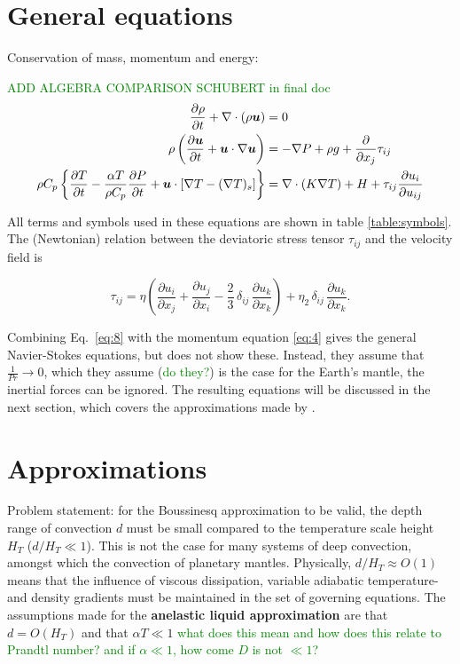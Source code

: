 \documentclass[document.tex]{subfiles}
\begin{document}
\section{\cite{jamc80} General equations}
Conservation of mass, momentum and energy: 

\textcolor{green}{ADD ALGEBRA COMPARISON SCHUBERT in final doc}
\begin{align}
    \pdv{\rho}{t} + \nabla \cdot (\rho\bm{u}) &= 0  \label{eq:3}\\
    \rho\left(\pdv{\bm{u}}{t} + \bm{u} \cdot \nabla \bm{u}\right) &= -\nabla P +\rho g + \pdv{x_j} \tau_{ij} \label{eq:4}\\
    \rho C_p \left\{\pdv{T}{t} - \frac{\alpha T}{\rho C_p}\pdv{P}{t} + \bm{u} \cdot [\nabla T - (\nabla T)_s]\right\} &= 
    \nabla \cdot (K\nabla T) + H + \tau_{ij}\pdv{u_i}{u_{ij}} \label{eq:5}
\end{align}

All terms and symbols used in these equations are shown in table \ref{table:symbols}. 
The (Newtonian) relation between the deviatoric stress tensor $\tau_{ij}$ and the velocity field is

\begin{equation}
\tau_{ij} = \eta \left( \frac{\partial u_i}{\partial x_j} + \frac{\partial u_j}{\partial x_i}
 - \frac{2}{3}\,\delta_{ij}\,\frac{\partial u_k}{\partial x_k} \right) 
 + \eta_2\,\delta_{ij}\,\frac{\partial u_k}{\partial x_k}.
\label{eq:8}
\end{equation}

Combining Eq.~\eqref{eq:8} with the momentum equation \eqref{eq:4} gives the general Navier-Stokes equations, 
but \textcite{jamc80} does not show these. Instead, they assume that $\frac{1}{Pr} \to 0$, which
they assume (\textcolor{green}{do they?}) is the case for the Earth's mantle, the inertial forces can be ignored. The resulting equations 
will be discussed in the next section, which covers the approximations made by \textcite{jamc80}. 

\section{\cite{jamc80} Approximations}
Problem statement: for the Boussinesq approximation to be valid, the depth range of convection $d$ must be 
small compared to the temperature scale height $H_T$ ($d/H_T \ll 1$). This is not the case for many systems of 
deep convection, amongst which the convection of planetary mantles. Physically, $d/H_T \approx O(1)$ means that 
the influence of viscous dissipation, variable adiabatic temperature- and density gradients must be maintained in the 
set of governing equations. 
\newline
The assumptions made for the \textbf{anelastic liquid approximation} are that $d=O(H_T)$ and that $\alpha T \ll 1$
\textcolor{green}{what does this mean and how does this relate to Prandtl number? 
and if $\alpha \ll 1$, how come $D$ is not $\ll 1$?} 
\end{document}
